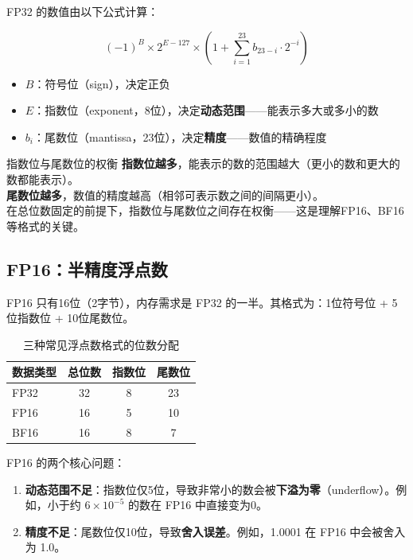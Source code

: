 \documentclass[a4paper]{article}
\begin{document}
FP32 的数值由以下公式计算：

$$(-1)^{B} \times 2^{E-127} \times \left(1 + \sum_{i=1}^{23} b_{23-i} \cdot 2^{-i}\right)$$

\begin{itemize}
    \item $B$：符号位（sign），决定正负
    \item $E$：指数位（exponent，8位），决定\textbf{动态范围}——能表示多大或多小的数
    \item $b_i$：尾数位（mantissa，23位），决定\textbf{精度}——数值的精确程度
\end{itemize}





\begin{knowledgebox}{指数位与尾数位的权衡}
\textbf{指数位越多}，能表示的数的范围越大（更小的数和更大的数都能表示）。\\
\textbf{尾数位越多}，数值的精度越高（相邻可表示数之间的间隔更小）。\\
在总位数固定的前提下，指数位与尾数位之间存在权衡——这是理解FP16、BF16等格式的关键。
\end{knowledgebox}

\subsection{FP16：半精度浮点数}

FP16 只有16位（2字节），内存需求是 FP32 的一半。其格式为：1位符号位 + 5位指数位 + 10位尾数位。





\begin{table}[H]
\centering
\begin{tabular}{lccc}
\toprule
\textbf{数据类型} & \textbf{总位数} & \textbf{指数位} & \textbf{尾数位} \\
\midrule
FP32  & 32 & 8  & 23 \\
FP16  & 16 & 5  & 10 \\
BF16  & 16 & 8  & 7  \\
\bottomrule
\end{tabular}
\caption{三种常见浮点数格式的位数分配}
\end{table}

FP16 的两个核心问题：

\begin{enumerate}
    \item \textbf{动态范围不足}：指数位仅5位，导致非常小的数会被\textbf{下溢为零}（underflow）。例如，小于约 $6 \times 10^{-5}$ 的数在 FP16 中直接变为0。
    \item \textbf{精度不足}：尾数位仅10位，导致\textbf{舍入误差}。例如，1.0001 在 FP16 中会被舍入为 1.0。
\end{enumerate}
\end{document}
